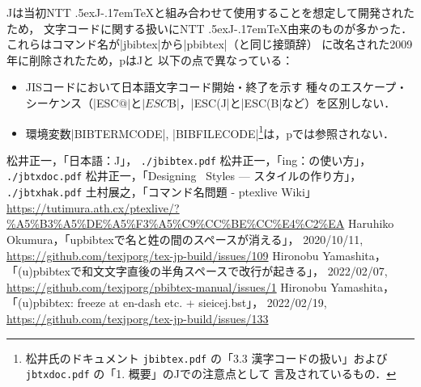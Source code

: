 \documentclass[a4paper,11pt,nomag,dvipdfmx]{jsarticle}
\def\file#1{\texttt{#1}}
\def\JTeX{\leavevmode\textcompwordmark\lower.5ex\hbox{J}\kern-.17em\TeX}
\def\JBibTeX{\leavevmode\textcompwordmark\lower.5ex\hbox{J}\kern-.08em\BibTeX}
\def\pBibTeX{p\kern-.05em\BibTeX}
\def\JBibTeX{J\BibTeX}%
\def\pBibTeX{p\BibTeX}%
\begin{document}
\JBibTeX は当初NTT \JTeX と組み合わせて使用することを想定して開発されたため，
文字コードに関する扱いにNTT \JTeX 由来のものが多かった．
これらはコマンド名が|jbibtex|から|pbibtex|（\pTeX と同じ接頭辞）
に改名された2009年に削除された\cite{ptexlive}ため，\pBibTeX は\JBibTeX と
以下の点で異なっている：
\begin{itemize}
 \item JISコードにおいて日本語文字コード開始・終了を示す
  種々のエスケープ・シーケンス（|ESC$@|と|ESC$B|，|ESC(J|と|ESC(B|など）を区別しない．
 \item 環境変数|BIBTERMCODE|, |BIBFILECODE|\footnote{松井氏のドキュメント
  \file{jbibtex.pdf} \cite{jbibtex}の「3.3 漢字コードの扱い」および
  \file{jbtxdoc.pdf} \cite{jbtxdoc}の「1. 概要」の\JBibTeX での注意点として
  言及されているもの．}は，\pBibTeX では参照されない．
\end{itemize}


\clearpage
\begin{thebibliography}{99}
  松井正一，「日本語\BibTeX ：\JBibTeX」，
  \file{./jbibtex.pdf}
  松井正一，「\BibTeX ing：\BibTeX の使い方」，
  \file{./jbtxdoc.pdf}
  松井正一，「Designing \BibTeX\ Styles --- \BibTeX スタイルの作り方」，
  \file{./jbtxhak.pdf}
  土村展之，「コマンド名問題 - ptexlive Wiki」\\
  \url{https://tutimura.ath.cx/ptexlive/?%A5%B3%A5%DE%A5%F3%A5%C9%CC%BE%CC%E4%C2%EA}
  Haruhiko Okumura，「upbibtexで名と姓の間のスペースが消える」，
  2020/10/11,\\
  \url{https://github.com/texjporg/tex-jp-build/issues/109}
  Hironobu Yamashita，「(u)pbibtexで和文文字直後の半角スペースで改行が起きる」，
  2022/02/07,\\
  \url{https://github.com/texjporg/pbibtex-manual/issues/1}
  Hironobu Yamashita，「(u)pbibtex: freeze at en-dash etc. + sieicej.bst」，
  2022/02/19,\\
  \url{https://github.com/texjporg/tex-jp-build/issues/133}
\end{thebibliography}
\end{document}
